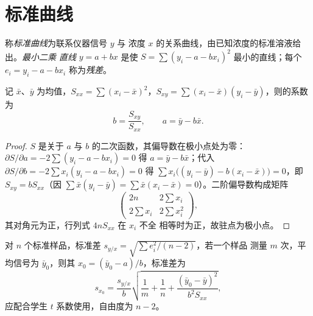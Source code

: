 \section{标准曲线}

\begin{definition}[标准曲线]\label{def:b2:measurement-statistics:calibration}
称\emph{标准曲线}为联系仪器信号 $y$ 与
浓度 $x$ 的关系曲线，由已知浓度的标准溶液给出。\emph{最小二乘
直线} $y = a + bx$ 是使 $S = \sum (y_i - a -
bx_i)^2$ 最小的直线；每个 $e_i = y_i - a - bx_i$ 称为\emph{残差}。
\end{definition}

\begin{theorem}[最小二乘直线]\label{thm:b2:measurement-statistics:least-squares}
记 $\bar x$、$\bar y$ 为均值，$S_{xx} = \sum(x_i - \bar x)^2$，$S_{xy} = \sum(x_i - \bar x)(y_i -
\bar y)$，则的系数为
\begin{equation*}
b = \frac{S_{xy}}{S_{xx}}, \qquad a = \bar y - b\bar x.
\end{equation*}
\end{theorem}

\begin{proof}
$S$ 是关于 $a$ 与 $b$ 的二次函数，其偏导数在极小点处为零：
$\partial S/\partial a = -2\sum(y_i - a - bx_i) = 0$ 得 $a = \bar y - b\bar x$；代入
$\partial S/\partial b = -2\sum x_i(y_i - a - bx_i) = 0$ 得 $\sum x_i\bigl((y_i - \bar y) - b(x_i -
\bar x)\bigr) = 0$，即 $S_{xy} = bS_{xx}$（因 $\sum \bar x(y_i - \bar y) = \sum \bar x(x_i - \bar
x) = 0$）。二阶偏导数构成矩阵
\[\begin{pmatrix} 2n & 2\sum x_i\\ 2\sum x_i & 2\sum x_i^2\end{pmatrix},\]
其对角元为正，行列式 $4nS_{xx}$ 在 $x_i$ 不全
相等时为正，故驻点为极小点。
\end{proof}

\begin{proposition}[由标准曲线读取浓度]\label{prop:b2:measurement-statistics:interpolation}
对 $n$ 个标准样品，标准差 $s_{y/x} = \sqrt{\sum e_i^2/(n-2)}$，若一个样品
测量 $m$ 次，平均信号为 $\bar y_0$，则其 $x_0 = (\bar y_0 - a)/b$，标准差为
\begin{equation*}
s_{x_0} = \frac{s_{y/x}}{b}\sqrt{\frac1m + \frac1n + \frac{(\bar y_0 - \bar y)^2}{b^2S_{xx}}},
\end{equation*}
应配合学生 $t$ 系数使用，自由度为 $n - 2$。
\end{proposition}

